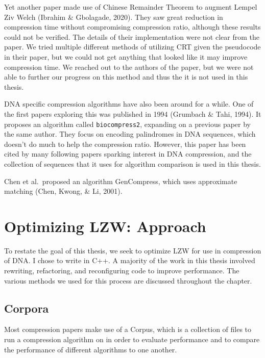 \documentclass[12pt,twoside]{reedthesis}
\begin{document}
Yet another paper made use of Chinese Remainder Theorem to augment Lempel Ziv Welch (Ibrahim \& Gbolagade, 2020). They saw great reduction in compression time without compromising compression ratio, although these results could not be verified. The details of their implementation were not clear from the paper. We tried multiple different methods of utilizing CRT given the pseudocode in their paper, but we could not get anything that looked like it may improve compression time. We reached out to the authors of the paper, but we were not able to further our progress on this method and thus the it is not used in this thesis.

DNA specific compression algorithms have also been around for a while. One of the first papers exploring this was published in 1994 (Grumbach \& Tahi, 1994). It proposes an algorithm called \texttt{biocompress2}, expanding on a previous paper by the same author. They focus on encoding palindromes in DNA sequences, which doesn't do much to help the compression ratio. However, this paper has been cited by many following papers sparking interest in DNA compression, and the collection of sequences that it uses for algorithm comparison is used in this thesis.

Chen et al.~proposed an algorithm GenCompress, which uses approximate matching (Chen, Kwong, \& Li, 2001).

\hypertarget{optimizing-lzw-approach}{%
\chapter{Optimizing LZW: Approach}\label{optimizing-lzw-approach}}

To restate the goal of this thesis, we seek to optimize LZW for use in compression of DNA. I chose to write in C++. A majority of the work in this thesis involved rewriting, refactoring, and reconfiguring code to improve performance. The various methods we used for this process are discussed throughout the chapter.

\hypertarget{corpora}{%
\section{Corpora}\label{corpora}}

Most compression papers make use of a Corpus, which is a collection of files to run a compression algorithm on in order to evaluate performance and to compare the performance of different algorithms to one another.
\end{document}
